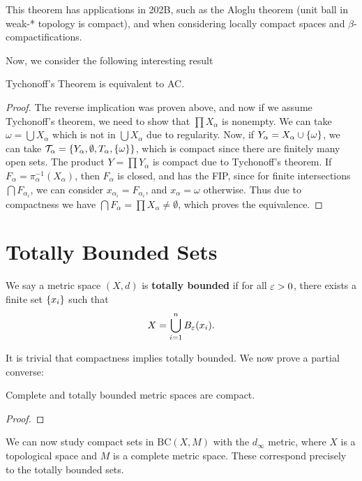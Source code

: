 This theorem has applications in 202B, such as the Aloglu theorem (unit ball in weak-* topology is compact), and when considering locally compact spaces and $\beta$-compactifications.

Now, we consider the following interesting result 

\begin{theorem}[Kelley]
    Tychonoff's Theorem is equivalent to AC.
\end{theorem}

\begin{proof}
    The reverse implication was proven above, and now if we assume Tychonoff's theorem, we need to show that $\prod X_\alpha$ is nonempty. We can take $\omega = \bigcup X_\alpha$ which is not in $\bigcup X_\alpha$ due to regularity. Now, if $Y_\alpha = X_\alpha \cup \qty{\omega}$, we can take $\mathcal T_\alpha = \qty{Y_\alpha, \emptyset, T_\alpha, \qty{\omega}}$, which is compact since there are finitely many open sets. The product $Y = \prod Y_\alpha$ is compact due to Tychonoff's theorem. If $F_\alpha = \pi_\alpha^{-1}(X_\alpha)$, then $F_\alpha$ is closed, and has the FIP, since for finite intersections $\bigcap F_{\alpha_i}$, we can consider $x_{\alpha_i} = F_{\alpha_i}$, and $x_\alpha = \omega$ otherwise. Thus due to compactness we have $\bigcap F_\alpha = \prod X_\alpha \ne \emptyset$, which proves the equivalence.
\end{proof}

\section{Totally Bounded Sets}

\begin{definition}
    We say a metric space $(X, d)$ is \textbf{totally bounded} if for all $\varepsilon > 0$, there exists a finite set $\qty{x_i}$ such that \[X = \bigcup_{i = 1}^n B_\varepsilon(x_i).\]
\end{definition}

It is trivial that compactness implies totally bounded. We now prove a partial converse:

\begin{theorem}
    Complete and totally bounded metric spaces are compact.
\end{theorem}

\begin{proof}
\end{proof}

We can now study compact sets in $\mathrm{BC}(X, M)$ with the $d_\infty$ metric, where $X$ is a topological space and $M$ is a complete metric space. These correspond precisely to the totally bounded sets.


